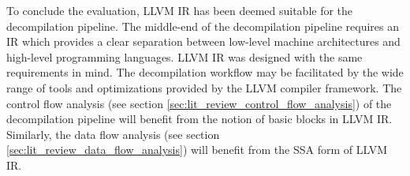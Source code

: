 To conclude the evaluation, LLVM IR has been deemed suitable for the decompilation pipeline. The middle-end of the decompilation pipeline requires an IR which provides a clear separation between low-level machine architectures and high-level programming languages. LLVM IR was designed with the same requirements in mind. The decompilation workflow may be facilitated by the wide range of tools and optimizations provided by the LLVM compiler framework. The control flow analysis (see section \ref{sec:lit_review_control_flow_analysis}) of the decompilation pipeline will benefit from the notion of basic blocks in LLVM IR. Similarly, the data flow analysis (see section \ref{sec:lit_review_data_flow_analysis}) will benefit from the SSA form of LLVM IR.
